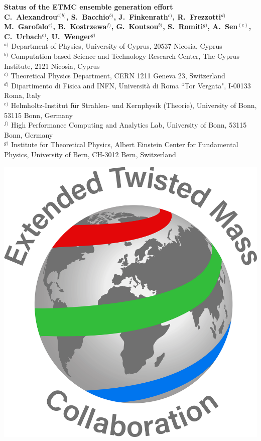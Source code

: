 \documentclass[a0,portrait]{a0poster}
\begin{document}
\begin{minipage}[b]{0.74\linewidth}
    \VeryHuge \color{NavyBlue} \textbf{Status of the ETMC ensemble generation effort} \color{Black}\\[1.4cm] %
    \Large \textbf{C.~Alexandrou$^{a)b)}$, S.~Bacchio$^{b)}$, J.~Finkenrath$^{c)}$, R.~Frezzotti$^{d)}$ M.~Garofalo$^{e)}$, B.~Kostrzewa$^{f)}$, G.~Koutsou$^{b)}$, S.~Romiti$^{g)}$, A.~Sen$^{(e)}$, C.~Urbach$^{e)}$, U.~Wenger$^{g)}$}\\[0.5cm] %
    \large $^{a)}$ Department of Physics, University of Cyprus, 20537 Nicosia, Cyprus\\
    \large $^{b)}$ Computation-based Science and Technology Research Center, The Cyprus Institute, 2121 Nicosia, Cyprus\\
    \large $^{c)}$ Theoretical Physics Department, CERN 1211 Geneva 23, Switzerland\\
    \large $^{d)}$ Dipartimento di Fisica and INFN, Universit\`a di Roma ``Tor Vergata", I-00133 Roma, Italy\\
    \large $^{e)}$ Helmholtz-Institut f{\"u}r Strahlen- und Kernphysik (Theorie), University of Bonn, 53115 Bonn, Germany\\
    \large $^{f)}$ High Performance Computing and Analytics Lab, University of Bonn, 53115 Bonn, Germany\\
    \large $^{g)}$  Institute for Theoretical Physics, Albert Einstein Center for Fundamental Physics, University of Bern, CH-3012 Bern, Switzerland\\
\end{minipage}
%
\begin{minipage}[b]{0.26\linewidth}
    \includegraphics[width=14cm]{figures/Logo_ETMC_RGB.pdf}
\end{minipage}
\end{document}
